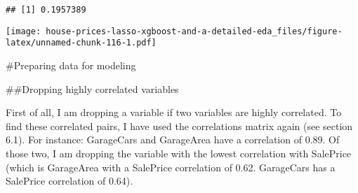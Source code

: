 \documentclass[]{article}
\newenvironment{Shaded}{\begin{snugshade}}{\end{snugshade}}
\newcommand{\DataTypeTok}[1]{\textcolor[rgb]{0.13,0.29,0.53}{#1}}
\newcommand{\DecValTok}[1]{\textcolor[rgb]{0.00,0.00,0.81}{#1}}
\newcommand{\KeywordTok}[1]{\textcolor[rgb]{0.13,0.29,0.53}{\textbf{#1}}}
\newcommand{\NormalTok}[1]{#1}
\newcommand{\OperatorTok}[1]{\textcolor[rgb]{0.81,0.36,0.00}{\textbf{#1}}}
\newcommand{\OtherTok}[1]{\textcolor[rgb]{0.56,0.35,0.01}{#1}}
\newcommand{\StringTok}[1]{\textcolor[rgb]{0.31,0.60,0.02}{#1}}
\begin{document}
\begin{Shaded}
\end{Shaded}

\begin{verbatim}
## [1] 0.1957389
\end{verbatim}

\begin{Shaded}
\end{Shaded}

\texttt{[image: house-prices-lasso-xgboost-and-a-detailed-eda\_files/figure-latex/unnamed-chunk-116-1.pdf]}

\#Preparing data for modeling

\#\#Dropping highly correlated variables

First of all, I am dropping a variable if two variables are highly
correlated. To find these correlated pairs, I have used the correlations
matrix again (see section 6.1). For instance: GarageCars and GarageArea
have a correlation of 0.89. Of those two, I am dropping the variable
with the lowest correlation with SalePrice (which is GarageArea with a
SalePrice correlation of 0.62. GarageCars has a SalePrice correlation of
0.64).
\end{document}
